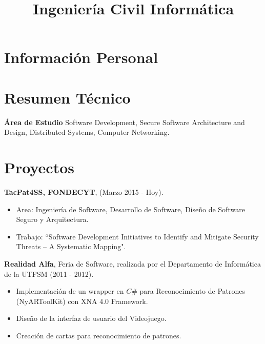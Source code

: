\documentclass[10pt,a4paper,sans]{moderncv}        %
\title{Ingeniería Civil Informática}
\begin{document}
\makecvtitle


\section{Información Personal}

\section{Resumen Técnico}
    \vspace{1 mm}
    \textbf{Área de Estudio} \-\hspace{0.15cm}Software Development, Secure Software Architecture and Design, Distributed Systems, Computer Networking.

\section{Proyectos}
\textbf{TacPat4SS, FONDECYT}, (Marzo 2015 - Hoy).
\begin{itemize}
	\item Area: Ingeniería de Software, Desarrollo de Software, Diseño de Software Seguro y Arquitectura.
	\item Trabajo: ``Software Development Initiatives to Identify and Mitigate Security Threats – A Systematic Mapping".
\end{itemize}
\vspace{3 mm}
\textbf{Realidad Alfa}, Feria de Software, realizada por el Departamento de Informática de la UTFSM (2011 - 2012).
\begin{itemize}
	\item Implementación de un wrapper en \(C\#\) para Reconocimiento de Patrones (NyARToolKit) con XNA 4.0 Framework.
	\item Diseño de la interfaz de usuario del Videojuego.
	\item Creación de cartas para reconocimiento de patrones.
\end{itemize}
\end{document}

